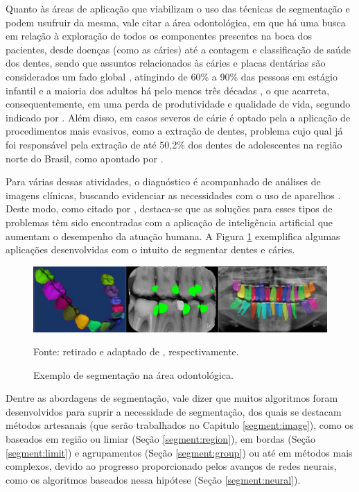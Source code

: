 Quanto às áreas de aplicação que viabilizam o uso das técnicas de segmentação e podem usufruir da mesma, vale citar a área odontológica, em que há uma busca em relação à exploração de todos os componentes presentes na boca dos pacientes, desde doenças (como as cáries) até a contagem e classificação de saúde dos dentes, sendo que assuntos relacionados às cáries e placas dentárias são considerados um fado global \cite{Kunihiro2016, Petersen2005}, atingindo de 60\% a 90\% das pessoas em estágio infantil e a maioria dos adultos há pelo menos três décadas \cite{Narvai2006}, o que acarreta, consequentemente, em uma perda de produtividade e qualidade de vida, segundo indicado por \cite{Kunihiro2016}. Além disso, em casos severos de cárie é optado pela a aplicação de procedimentos mais evasivos, como a extração de dentes, problema cujo qual já foi responsável pela extração de até 50,2\% dos dentes de adolescentes na região norte do Brasil, como apontado por \cite{Frias2007}.

Para várias dessas atividades, o diagnóstico é acompanhado de análises de imagens clínicas, buscando evidenciar as necessidades com o uso de aparelhos \cite{Schwendicke2020}. Deste modo, como citado por \cite{Bansal2021, Nguyen2021,Schwendicke2020}, destaca-se que as soluções para esses tipos de problemas têm sido encontradas com a aplicação de inteligência artificial que aumentam o desempenho da atuação humana. A Figura \ref{intro:fig:4} exemplifica algumas aplicações desenvolvidas com o intuito de segmentar dentes e cáries.

\begin{figure}[H]
    \centering
    \caption{Exemplo de segmentação na área odontológica.}
    \includegraphics[width=1\linewidth]{recursos/imagens/introduction/odonto_segmentation.png}
    \label{intro:fig:4}

    Fonte: retirado e adaptado de \cite{Shuai2016,Bayrakdar2021,Gil2019}, respectivamente.
\end{figure}

Dentre as abordagens de segmentação, vale dizer que muitos algoritmos foram desenvolvidos para suprir a necessidade de segmentação, dos quais se destacam métodos artesanais (que serão trabalhados no Capitulo \ref{segment:image}), como os baseados em região ou limiar (Seção \ref{segment:region}), em bordas (Seção \ref{segment:limit}) e agrupamentos (Seção \ref{segment:group}) ou até em métodos mais complexos, devido ao progresso proporcionado pelos avanços de redes neurais, como os algoritmos baseados nessa hipótese (Seção \ref{segment:neural}).

